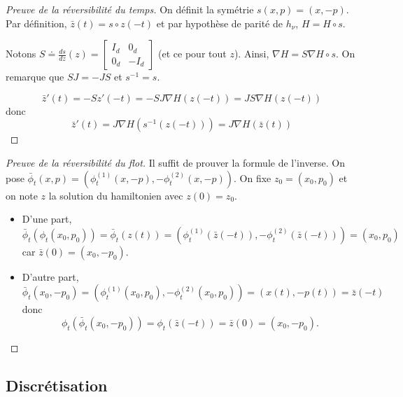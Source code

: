 \documentclass[10pt]{beamer}
\begin{document}
\begin{frame}
	\begin{proof}[Preuve de la réversibilité du temps]
		On définit la symétrie $s(x,p) = (x,-p)$. Par définition, $\bar{z}(t) = s \circ z (-t)$ et par hypothèse de parité de $h_\nu$, $H = H \circ s$.

		Notons $S \doteq \frac{ds}{dz}(z) = \begin{bmatrix} I_d & 0_d \\ 0_d & -I_d \end{bmatrix}$ (et ce pour tout $z$). Ainsi, $\nabla H = S \nabla H \circ s$. On remarque que $SJ = -JS$ et $s^{-1} = s$.

		$$\bar z'(t) = -Sz'(-t) = -SJ\nabla H(z(-t)) = JS \nabla H(z(-t))$$
		donc
		$$\bar z'(t) = J \nabla H (s^{-1}(z(-t))) = J \nabla H(\bar z(t))$$
	\end{proof}
\end{frame}

\begin{frame}
	\begin{proof}[Preuve de la réversibilité du flot]
		Il suffit de prouver la formule de l'inverse. On pose $\bar \phi_t(x,p) = (\phi_t^{(1)}(x, -p), - \phi_t^{(2)}(x, -p))$. On fixe $z_0 = (x_0,p_0)$ et on note $z$ la solution du hamiltonien avec $z(0) = z_0$.
		\begin{itemize}
			\item D'une part,
			$$
			\bar \phi_t(\phi_t(x_0,p_0)) = \bar \phi_t(z(t)) = (\phi_t^{(1)}(\bar z(-t)), - \phi_t^{(2)}(\bar z(-t))) = (x_0, p_0)
			$$
			car $\bar z(0) = (x_0,-p_0)$.

			\item D'autre part,
			$$
			\bar \phi_t(x_0,-p_0) = (\phi_t^{(1)}(x_0, p_0), - \phi_t^{(2)}(x_0, p_0)) = (x(t),-p(t)) = \bar z(-t)
			$$
			donc
			$$
			\phi_t (\bar \phi_t(x_0,-p_0)) = \phi_t(\bar z(-t)) = \bar{z}(0) = (x_0,-p_0).
			$$
		\end{itemize}
	\end{proof}
\end{frame}
 
\subsection{Discrétisation}
 
\end{document}
